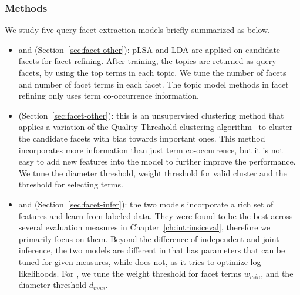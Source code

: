\subsubsection{Methods}
We study five query facet extraction models briefly summarized as below.
\begin{itemize}
\item \PLSA and \LDA (Section~\ref{sec:facet-other}): pLSA and LDA are applied on candidate facets for facet refining. %
After training, the topics are returned as query facets, by using the top terms in each topic. We tune the number of facets and number of facet terms in each facet. The topic model methods in facet refining only uses term co-occurrence information.
\item \QDM (Section~\ref{sec:facet-other}): this is an unsupervised clustering method that applies a variation of the Quality Threshold clustering algorithm~\cite{heyer1999exploring} to cluster the candidate facets with bias towards important ones. 
This method incorporates more information than just term co-occurrence, but it is not easy to add new features into the model to further improve the performance.
We tune the diameter threshold, weight threshold for valid cluster and the threshold for selecting terms.
\item \QFI and \QFJ (Section~\ref{sec:facet-infer}): the two models incorporate a rich set of features and learn from labeled data. They were found to be the best across several evaluation measures in Chapter~\ref{ch:intrinsiceval}, therefore we primarily focus on them. Beyond the difference of independent and joint inference, the two models are different in that \QFI has parameters that can be tuned for given measures, while \QFJ does not, as it tries to optimize log-likelihoods. For \QFI, we tune the weight threshold for facet terms $w_{min}$, and the diameter threshold $d_{max}$.
\end{itemize}


